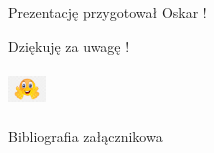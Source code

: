 \documentclass{beamer}
\begin{document}
\begin{frame}
	\begin{Center}
		\begin{spacing}{1} Prezentację przygotował Oskar !\end{spacing}
		\begin{spacing}{2} Dziękuję za uwagę !\end{spacing}
		\begin{spacing}{2} \includegraphics[width=1cm,height=1cm]{usmiechnieta_buzka.png} \end{spacing}
	\end{Center}
\end{frame}

\begin{frame}{Bibliografia załącznikowa}
\end{frame}
\end{document}
